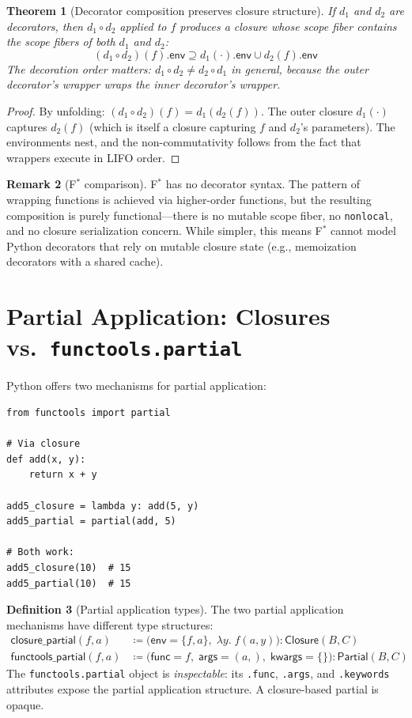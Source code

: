 \documentclass[11pt,a4paper]{report}
\theoremstyle{definition}
\newtheorem{definition}{Definition}[chapter]
\newtheorem{remark}[definition]{Remark}
\theoremstyle{plain}
\newtheorem{theorem}[definition]{Theorem}
\newcommand{\defeq}{\coloneqq}
\newcommand{\fstar}{F$^{*}$}
\begin{document}
\begin{theorem}[Decorator composition preserves closure structure]
If $d_1$ and $d_2$ are decorators, then $d_1 \circ d_2$ applied to $f$
produces a closure whose scope fiber contains the scope fibers of both
$d_1$ and $d_2$:
\[
  (d_1 \circ d_2)(f).\mathsf{env} \supseteq
    d_1(\cdot).\mathsf{env} \cup d_2(f).\mathsf{env}
\]
The decoration order matters: $d_1 \circ d_2 \neq d_2 \circ d_1$ in
general, because the outer decorator's wrapper wraps the inner decorator's
wrapper.
\end{theorem}
\begin{proof}
By unfolding: $(d_1 \circ d_2)(f) = d_1(d_2(f))$.  The outer closure
$d_1(\cdot)$ captures $d_2(f)$ (which is itself a closure capturing $f$
and $d_2$'s parameters).  The environments nest, and the non-commutativity
follows from the fact that wrappers execute in LIFO order.
\end{proof}

\begin{remark}[\fstar{} comparison]
\fstar{} has no decorator syntax.  The pattern of wrapping functions is
achieved via higher-order functions, but the resulting composition is
purely functional---there is no mutable scope fiber, no \texttt{nonlocal},
and no closure serialization concern.  While simpler, this means \fstar{}
cannot model Python decorators that rely on mutable closure state
(e.g., memoization decorators with a shared cache).
\end{remark}

\section{Partial Application: Closures vs.\ \texttt{functools.partial}}

Python offers two mechanisms for partial application:

\begin{lstlisting}[style=python]
from functools import partial

# Via closure
def add(x, y):
    return x + y

add5_closure = lambda y: add(5, y)
add5_partial = partial(add, 5)

# Both work:
add5_closure(10)  # 15
add5_partial(10)  # 15
\end{lstlisting}

\begin{definition}[Partial application types]
The two partial application mechanisms have different type structures:
\begin{align}
  \mathsf{closure\_partial}(f, a) &\defeq
    \bigl(\mathsf{env} = \{f, a\},\;
      \lambda y.\; f(a, y)\bigr)
    : \mathsf{Closure}(B, C) \\
  \mathsf{functools\_partial}(f, a) &\defeq
    \bigl(\mathsf{func} = f,\;
      \mathsf{args} = (a,),\;
      \mathsf{kwargs} = \{\}\bigr)
    : \mathsf{Partial}(B, C)
\end{align}
The \texttt{functools.partial} object is \emph{inspectable}: its
\texttt{.func}, \texttt{.args}, and \texttt{.keywords} attributes expose
the partial application structure.  A closure-based partial is opaque.
\end{definition}
\end{document}
